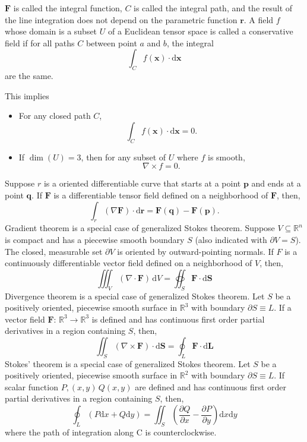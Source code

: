\documentclass[a4paper,12pt]{report}
\begin{document}
\begin{itemize}
\begin{itemize}
$\mathbf{F}$ is called the integral function, $C$ is called the integral path, and the result of the line integration does not depend on the parametric function $\mathbf{r}$.
A field $f$ whose domain is a subset $U$ of a Euclidean tensor space is called a conservative field if for all paths $C$ between point $a$ and $b$, the integral 
\[\int_Cf(\mathbf{x})\cdot\mathrm{d}\mathbf{x}\]
are the same.

This implies 
\begin{itemize}
\item For any closed path $C$, 
\[\int_Cf(\mathbf{x})\cdot\mathrm{d}\mathbf{x}=0.\]
\item If $\operatorname{dim}(U)=3$, then for any subset of $U$ where $f$ is smooth,
\[\nabla\times f=0.\]
\end{itemize}
Suppose $r$ is a oriented differentiable curve that starts at a point $\mathbf{p}$ and ends at a point $\mathbf{q}$. If $\mathbf{F}$ is a differentiable tensor field defined on a neighborhood of $\mathbf{F}$, then,
\[\int_r(\nabla\mathbf{F})\cdot\mathrm{d}\mathbf{r}=\mathbf{F}\left(\mathbf{q}\right)-\mathbf{F}\left(\mathbf{p}\right).\]
Gradient theorem is a special case of generalized Stokes theorem.
Suppose $V\subseteq\mathbb{R}^n$ is compact and has a piecewise smooth boundary $S$ (also indicated with $\partial V=S$). The closed, measurable set $\partial V$ is oriented by outward-pointing normals. If $F$ is a continuously differentiable vector field defined on a neighborhood of $V$, then,
\[\iiint_V\left(\nabla\cdot\mathbf {F}\right)\,\mathrm{d}V=\oiint_S\mathbf{F}\cdot\mathrm{d}\mathbf{S}\]
Divergence theorem is a special case of generalized Stokes theorem.
Let $S$ be a positively oriented, piecewise smooth surface in $\mathbb{R}^3$ with boundary $\partial S\equiv L$. If a vector field $\mathbf{F}:\,\mathbb{R}^3\rightarrow\mathbb{R}^3$ is defined and has continuous first order partial derivatives in a region containing $S$, then,
\[\iint_S(\nabla\times\mathbf{F})\cdot \mathrm{d}\mathbf{S}=\oint_{L}\mathbf{F}\cdot\mathrm{d}\mathbf{L}\]
Stokes' theorem is a special case of generalized Stokes theorem.
Let $S$ be a positively oriented, piecewise smooth surface in $\mathbb{R}^2$ with boundary $\partial S\equiv L$. If scalar function $P,(x,y)\,Q(x,y)$ are defined and has continuous first order partial derivatives in a region containing $S$, then,
\[\oint_L (P\mathrm{d}x+Q\mathrm{d}y)=\iint_S\left(\frac{\partial Q}{\partial x}-\frac{\partial P}{\partial y}\right)\mathrm{d}x\mathrm{d}y\]
where the path of integration along C is counterclockwise.


\end{itemize}
\end{itemize}
\end{document}
